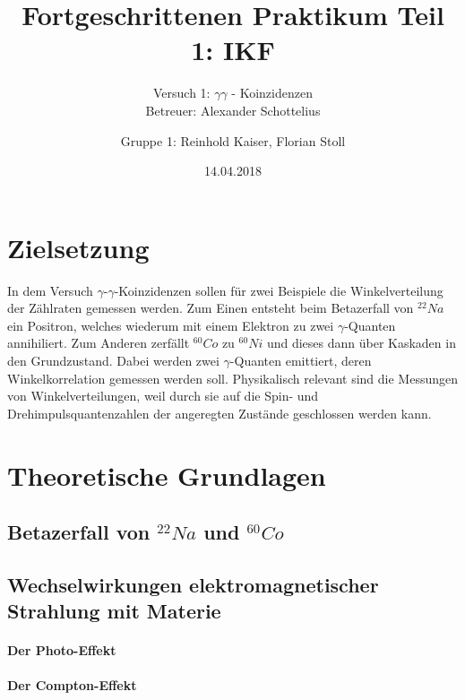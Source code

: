 \documentclass[11pt]{scrartcl}
\title{Fortgeschrittenen Praktikum Teil 1: IKF}
\subtitle{Versuch 1: $\gamma \gamma$ - Koinzidenzen \\ Betreuer: Alexander Schottelius}
\author{Gruppe 1: Reinhold Kaiser, Florian Stoll}
\date{14.04.2018}
\begin{document}
\maketitle
\newpage
\tableofcontents
\newpage

\section{Zielsetzung}
In dem Versuch $\gamma$-$\gamma$-Koinzidenzen sollen für zwei Beispiele die Winkelverteilung der Zählraten
gemessen werden. Zum Einen entsteht beim Betazerfall von $^{22}Na$ ein Positron, welches wiederum mit
einem Elektron zu zwei $\gamma$-Quanten annihiliert. Zum Anderen zerfällt $^{60}Co$ zu $^{60}Ni$
und dieses dann über Kaskaden in den Grundzustand. Dabei werden zwei $\gamma$-Quanten emittiert,
deren Winkelkorrelation gemessen werden soll. Physikalisch relevant sind die Messungen von 
Winkelverteilungen, weil durch sie auf die Spin- und Drehimpulsquantenzahlen der angeregten Zustände 
geschlossen werden kann.


\section{Theoretische Grundlagen}

\subsection{Betazerfall von $^{22}Na$ und $^{60}Co$}

\subsection{Wechselwirkungen elektromagnetischer Strahlung mit Materie}

\paragraph{Der Photo-Effekt}



\paragraph{Der Compton-Effekt}
\end{document}
